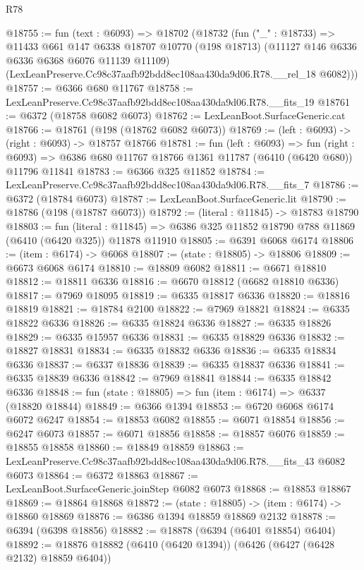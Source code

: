 \begin{lexlean}{R78}
\begin{coremodule}
@18755 := fun (text : @6093) =>
  @18702
    (@18732
      (fun ("_" : @18733) =>
      @11433
        @661
        @147
        @6338
        @18707
        @10770
        (@198 @18713)
        (@11127 @146 @6336 @6336 @6368 @6076 @11139 @11109)
        (LexLeanPreserve.Cc98c37aafb92bdd8ec108aa430da9d06.R78.__rel_18 @6082)))
@18757 := @6366 @680 @11767
@18758 := LexLeanPreserve.Cc98c37aafb92bdd8ec108aa430da9d06.R78.__fits_19
@18761 := @6372 (@18758 @6082 @6073)
@18762 := LexLeanBoot.SurfaceGeneric.cat
@18766 := @18761 (@198 (@18762 @6082 @6073))
@18769 := (left : @6093) -> (right : @6093) -> @18757 @18766
@18781 := fun (left : @6093) =>
  fun (right : @6093) => @6386 @680 @11767 @18766 @1361 @11787 (@6410 (@6420 @680)) @11796 @11841
@18783 := @6366 @325 @11852
@18784 := LexLeanPreserve.Cc98c37aafb92bdd8ec108aa430da9d06.R78.__fits_7
@18786 := @6372 (@18784 @6073)
@18787 := LexLeanBoot.SurfaceGeneric.lit
@18790 := @18786 (@198 (@18787 @6073))
@18792 := (literal : @11845) -> @18783 @18790
@18803 := fun (literal : @11845) =>
  @6386 @325 @11852 @18790 @788 @11869 (@6410 (@6420 @325)) @11878 @11910
@18805 := @6391 @6068 @6174
@18806 := (item : @6174) -> @6068
@18807 := (state : @18805) -> @18806
@18809 := @6673 @6068 @6174
@18810 := @18809 @6082
@18811 := @6671 @18810
@18812 := @18811 @6336
@18816 := @6670 @18812 (@6682 @18810 @6336)
@18817 := @7969 @18095
@18819 := @6335 @18817 @6336
@18820 := @18816 @18819
@18821 := @18784 @2100
@18822 := @7969 @18821
@18824 := @6335 @18822 @6336
@18826 := @6335 @18824 @6336
@18827 := @6335 @18826
@18829 := @6335 @15957 @6336
@18831 := @6335 @18829 @6336
@18832 := @18827 @18831
@18834 := @6335 @18832 @6336
@18836 := @6335 @18834 @6336
@18837 := @6337 @18836
@18839 := @6335 @18837 @6336
@18841 := @6335 @18839 @6336
@18842 := @7969 @18841
@18844 := @6335 @18842 @6336
@18848 := fun (state : @18805) => fun (item : @6174) => @6337 (@18820 @18844)
@18849 := @6366 @1394
@18853 := @6720 @6068 @6174 @6072 @6247
@18854 := @18853 @6082
@18855 := @6071 @18854
@18856 := @6247 @6073
@18857 := @6071 @18856
@18858 := @18857 @6076
@18859 := @18855 @18858
@18860 := @18849 @18859
@18863 := LexLeanPreserve.Cc98c37aafb92bdd8ec108aa430da9d06.R78.__fits_43 @6082 @6073
@18864 := @6372 @18863
@18867 := LexLeanBoot.SurfaceGeneric.joinStep @6082 @6073
@18868 := @18853 @18867
@18869 := @18864 @18868
@18872 := (state : @18805) -> (item : @6174) -> @18860 @18869
@18876 := @6386 @1394 @18859 @18869 @2132
@18878 := @6394 (@6398 @18856)
@18882 := @18878 (@6394 (@6401 @18854) @6404)
@18892 := @18876 @18882 (@6410 (@6420 @1394)) (@6426 (@6427 (@6428 @2132) @18859 @6404))

\end{coremodule}
\end{lexlean}
